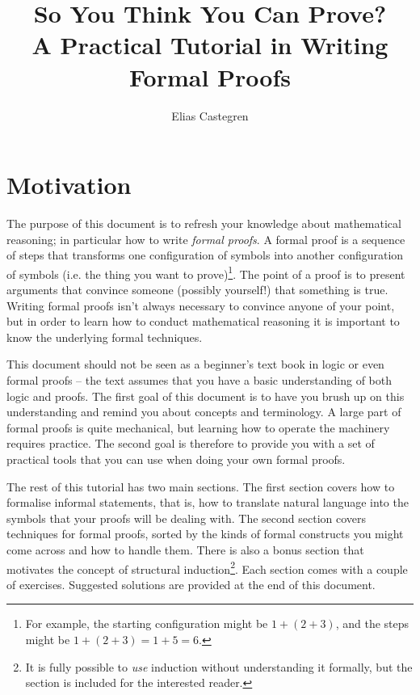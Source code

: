 \documentclass{tufte-handout}
\title[So You Think You Can Prove?]{So You Think You Can Prove?\\
{\large A Practical Tutorial in Writing Formal Proofs}}
\author{Elias Castegren}
\newcounter{example}
\begin{document}
\maketitle


\section{Motivation}

The purpose of this document is to refresh your knowledge about
mathematical reasoning; in particular how to write \emph{formal
  proofs}. A formal proof is a sequence of steps that transforms
one configuration of symbols into another configuration of symbols
(i.e. the thing you want to prove)\footnote{For example, the
  starting configuration might be $1 + (2 + 3)$, and the steps
  might be $1 + (2 + 3) = 1 + 5 = 6$.}.
%
The point of a proof is to present arguments that convince someone
(possibly yourself!) that something is true.
%
Writing formal proofs isn't always necessary to convince anyone of
your point, but in order to learn how to conduct mathematical
reasoning it is important to know the underlying formal
techniques.

This document should not be seen as a beginner's text book in
logic or even formal proofs -- the text assumes that you have a
basic understanding of both logic and proofs. The first goal of
this document is to have you brush up on this understanding and
remind you about concepts and terminology. A large part of formal
proofs is quite mechanical, but learning how to operate the
machinery requires practice. The second goal is therefore to
provide you with a set of practical tools that you can use when
doing your own formal proofs.

The rest of this tutorial has two main sections.
%
The first section covers how to formalise informal statements,
that is, how to translate natural language into the symbols that
your proofs will be dealing with.
%
The second section covers techniques for formal proofs, sorted by
the kinds of formal constructs you might come across and how to
handle them.
%
There is also a bonus section that motivates the concept of
structural induction\footnote{It is fully possible to \emph{use}
  induction without understanding it formally, but the section is
  included for the interested reader.}.
%
Each section comes with a couple of exercises. Suggested solutions
are provided at the end of this document.
\end{document}

